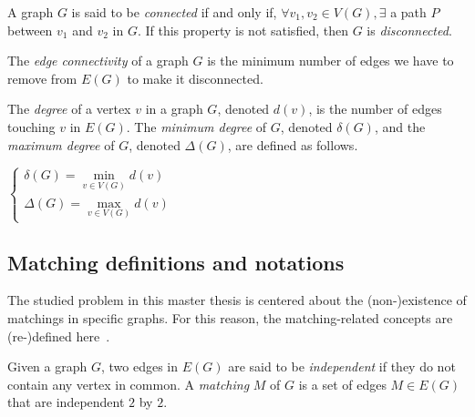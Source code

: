 \begin{definition}
    \label{def:connected_graph}
    A graph $G$ is said to be \textit{connected} if and only if, $\forall v_1, v_2 \in V(G), \exists$ a path $P$ between $v_1$ and $v_2$ in $G$.
    If this property is not satisfied, then $G$ is \textit{disconnected}.
\end{definition}

\begin{definition}
    \label{def:edge_connectivity}
    The \textit{edge connectivity} of a graph $G$ is the minimum number of edges we have to remove from $E(G)$ to make it disconnected.
\end{definition}

\begin{definition}
    \label{def:degree}
    The \textit{degree} of a vertex $v$ in a graph $G$, denoted $d(v)$, is the number of edges touching $v$ in $E(G)$.
    The \textit{minimum degree} of $G$, denoted $\delta(G)$, and the \textit{maximum degree} of $G$, denoted $\Delta(G)$, are defined as follows.
    \begin{center}
        $\left\{
        \begin{array}{l}
            \delta(G) = \min\limits_{v \in V(G)} d(v)\\
            \Delta(G) = \max\limits_{v \in V(G)} d(v)
        \end{array}
        \right.$
    \end{center}
\end{definition}


\subsection{Matching definitions and notations}
\label{subsec:matching-definitions-and-notations}

The studied problem in this master thesis is centered about the (non-)existence of matchings in specific graphs.
For this reason, the matching-related concepts are (re-)defined here~\cite{graphtheory}.

\begin{definition}[Matching]
    \label{def:matching}
    Given a graph $G$, two edges in $E(G)$ are said to be \textit{independent} if they do not contain any vertex in common.
    A \textit{matching} $M$ of $G$ is a set of edges $M \in E(G)$ that are independent $2$ by $2$.
\end{definition}

